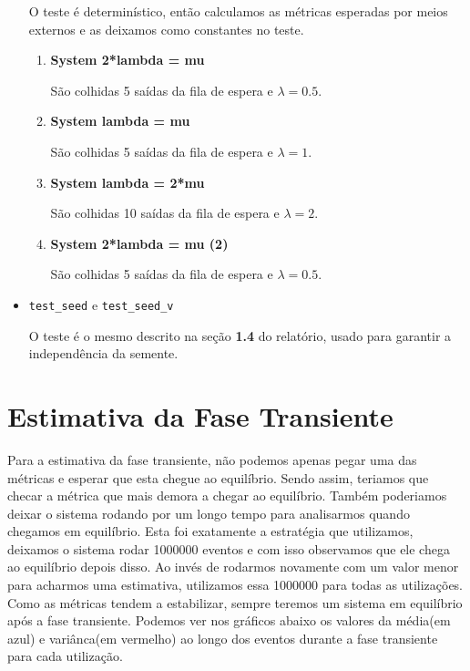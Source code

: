 \documentclass[a4paper]{article}
\newcommand{\inlcode}{\texttt}
\begin{document}
\begin{itemize}
        O teste é determinístico, então
        calculamos as métricas esperadas
        por meios externos e
        as deixamos como constantes no teste.
        \begin{enumerate}
            \item \textbf{System 2*lambda = mu} \par
                São colhidas 5 saídas da fila de espera
                e \(\lambda = 0.5\).
            \item \textbf{System lambda = mu} \par
                São colhidas 5 saídas da fila de espera
                e \(\lambda = 1\).
            \item \textbf{System lambda = 2*mu} \par
                São colhidas 10 saídas da fila de espera
                e \(\lambda = 2\).
            \item \textbf{System 2*lambda = mu (2)} \par
                São colhidas 5 saídas da fila de espera
                e \(\lambda = 0.5\).
        \end{enumerate}
    \item \inlcode{test\_seed} e \inlcode{test\_seed\_v} \par
        O teste é o mesmo descrito
        na seção \textbf{1.4} do relatório,
        usado para garantir a independência da semente.
\end{itemize}

\newpage
\section{Estimativa da Fase Transiente}
Para a estimativa da fase transiente, não podemos apenas pegar uma das métricas e esperar que esta chegue ao equilíbrio. Sendo assim, teriamos que checar a métrica que mais demora a chegar ao equilíbrio. Também poderiamos deixar o sistema rodando por um longo tempo para analisarmos quando chegamos em equilíbrio. Esta foi exatamente a estratégia que utilizamos, deixamos o sistema rodar 1000000 eventos e com isso observamos que ele chega ao equilíbrio depois disso. Ao invés de rodarmos novamente com um valor menor para acharmos uma estimativa, utilizamos essa 1000000 para todas as utilizações. Como as métricas tendem a estabilizar, sempre teremos um sistema em equilíbrio após a fase transiente. Podemos ver nos gráficos abaixo os valores da média(em azul) e variânca(em vermelho) ao longo dos eventos durante a fase transiente para cada utilização.
\end{document}
